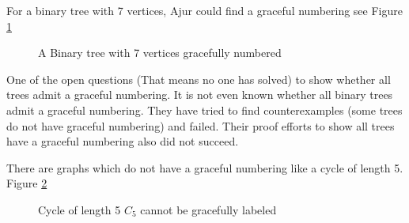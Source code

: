 For a binary tree with 7 vertices, Ajur could find a graceful numbering see Figure \ref{19g3}

\begin{figure}
\begin{center}


\caption{A Binary tree with 7 vertices gracefully numbered }\label{19g3}
\end{center}
\end{figure}

One of the open questions (That means no one has solved) to show whether all trees admit a graceful numbering. It is not even known whether all binary trees admit a graceful numbering. They have
  tried to find counterexamples (some trees do not have graceful numbering) and failed. Their proof efforts to show all trees have a graceful numbering also did not succeed.
  
  There are graphs which do not have a graceful numbering like a cycle of length 5. Figure \ref{19g4}

\begin{figure}
\begin{center}


\caption{Cycle of length 5 $C_5$ cannot be gracefully labeled }\label{19g4}
\end{center}
\end{figure}

